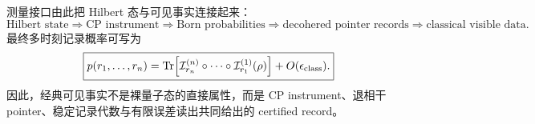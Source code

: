 测量接口由此把 Hilbert 态与可见事实连接起来：
\[
\boxed{
\text{Hilbert state}
\Rightarrow
\text{CP instrument}
\Rightarrow
\text{Born probabilities}
\Rightarrow
\text{decohered pointer records}
\Rightarrow
\text{classical visible data}.
}
\]
最终多时刻记录概率可写为
\[
\boxed{
p(r_1,\ldots,r_n)
=
{\rm Tr}\!\left[
\mathcal I_{r_n}^{(n)}
\circ\cdots\circ
\mathcal I_{r_1}^{(1)}(\rho)
\right]
+O(\epsilon_{\rm class}).
}
\]
因此，经典可见事实不是裸量子态的直接属性，而是 CP instrument、退相干 pointer、稳定记录代数与有限误差读出共同给出的 certified record。

